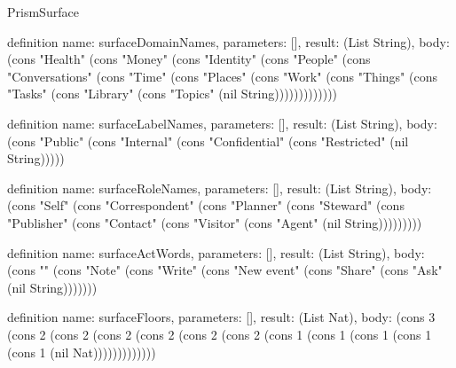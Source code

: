 \begin{lexlean}{PrismSurface}
\begin{semanticmodule}
definition{
  name: surfaceDomainNames,
  parameters: [],
  result: (List String),
  body: (cons "Health" (cons "Money" (cons "Identity" (cons "People" (cons "Conversations" (cons "Time" (cons "Places" (cons "Work" (cons "Things" (cons "Tasks" (cons "Library" (cons "Topics" (nil String)))))))))))))
}

definition{
  name: surfaceLabelNames,
  parameters: [],
  result: (List String),
  body: (cons "Public" (cons "Internal" (cons "Confidential" (cons "Restricted" (nil String)))))
}

definition{
  name: surfaceRoleNames,
  parameters: [],
  result: (List String),
  body: (cons "Self" (cons "Correspondent" (cons "Planner" (cons "Steward" (cons "Publisher" (cons "Contact" (cons "Visitor" (cons "Agent" (nil String)))))))))
}

definition{
  name: surfaceActWords,
  parameters: [],
  result: (List String),
  body: (cons "" (cons "Note" (cons "Write" (cons "New event" (cons "Share" (cons "Ask" (nil String)))))))
}

definition{
  name: surfaceFloors,
  parameters: [],
  result: (List Nat),
  body: (cons 3 (cons 2 (cons 2 (cons 2 (cons 2 (cons 2 (cons 2 (cons 1 (cons 1 (cons 1 (cons 1 (cons 1 (nil Nat)))))))))))))
}


\end{semanticmodule}
\end{lexlean}
